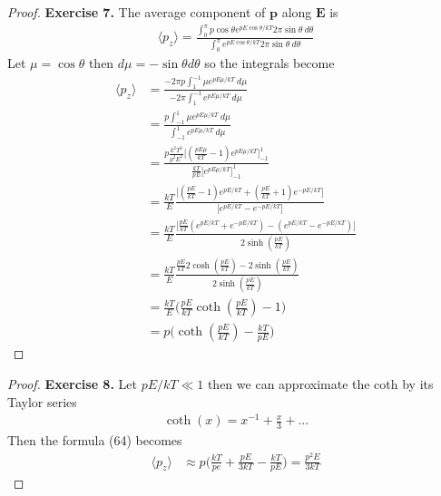 \documentclass[11pt]{article}
\theoremstyle{definition}
\begin{document}
\cleardoublepage
\begin{proof}{\textbf{Exercise 7.}}
The average component of $\bm{p}$ along $\bm{E}$ is
\begin{align*}
    \langle p_z \rangle = \frac{\int_0^\pi p \cos\theta e^{pE\cos\theta /kT}2\pi \sin\theta~d\theta}
    {\int_0^\pi e^{pE\cos\theta / kT}2\pi \sin\theta~d\theta}
\end{align*}
Let $\mu = \cos\theta$ then $d\mu = -\sin\theta d\theta$ so the integrals
become
\begin{align*}
    \langle p_z \rangle
    &= \frac{-2\pi p\int_1^{-1} \mu e^{pE\mu /kT}~d\mu}
    {-2\pi\int_1^{-1} e^{pE\mu / kT}~d\mu}\\
    &= \frac{p\int_{-1}^1 \mu e^{pE\mu /kT}~d\mu}
    {\int_{-1}^1 e^{pE\mu / kT}~d\mu}\\
    &= \frac{p\frac{k^2T^2}{p^2E^2}\bigg[(\frac{pE\mu}{kT} - 1)e^{pE\mu /kT}\bigg]_{-1}^1}
    {\frac{kT}{pE}\bigg[e^{pE\mu / kT}\bigg]_{-1}^1}\\
    &= \frac{kT}{E}
    \frac{\bigg[(\frac{pE}{kT} - 1)e^{pE /kT} + (\frac{pE}{kT} + 1)e^{-pE /kT}\bigg]}
    {\bigg[e^{pE / kT} - e^{-pE / kT}\bigg]}\\
    &= \frac{kT}{E}
    \frac{\bigg[\frac{pE}{kT}(e^{pE /kT}+ e^{-pE /kT}) - (e^{pE /kT} - e^{-pE /kT})\bigg]}
    {2\sinh(\frac{pE}{kT})}\\
    &= \frac{kT}{E}
    \frac{\frac{pE}{kT}2\cosh(\frac{pE}{kT}) - 2\sinh(\frac{pE}{kT})}
    {2\sinh(\frac{pE}{kT})}\\
    &= \frac{kT}{E}\bigg(\frac{pE}{kT}\coth(\frac{pE}{kT}) - 1\bigg)\\
    &= p\bigg(\coth(\frac{pE}{kT}) - \frac{kT}{pE}\bigg)
\end{align*}
\end{proof}

\cleardoublepage
\begin{proof}{\textbf{Exercise 8.}}
Let $pE/kT \ll 1$ then we can approximate the coth by its Taylor series
\begin{align*}
    \coth(x) = x^{-1} + \frac{x}{3} + ...
\end{align*}
Then the formula (64) becomes 
\begin{align*}
    \langle p_z \rangle &\approx
    p\bigg(\frac{kT}{pe} + \frac{pE}{3kT} - \frac{kT}{pE}\bigg)
    = \frac{p^2E}{3kT}
\end{align*}
\end{proof}
\end{document}
